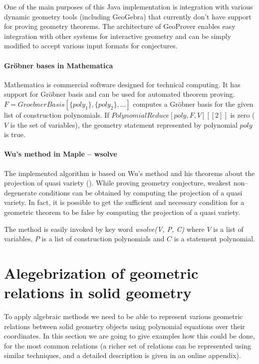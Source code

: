 \documentclass[final,1p,times,authoryear]{elsarticle}
\begin{document}
One of the main purposes of this Java implementation is integration
with various dynamic geometry tools (including GeoGebra) that
currently don't have support for proving geometry theorems. The
architecture of GeoProver enables easy integration with other systems
for interactive geometry and can be simply modified to accept various
input formats for conjectures.

\paragraph{Gr\"obner bases in Mathematica}

Mathematica is commercial software designed for technical
computing. It has support for Gr\"obner basis and can be used for
automated theorem proving. $F = GroebnerBasis[\{poly_1\}, \{poly_2\},
  \ldots]$ computes a Gr\"obner basis for the given list of
construction polynomials. If $PolynomialReduce[poly, F, V][[2]]$ is
zero ($V$ is the set of variables), the geometry statement represented
by polynomial $poly$ is true.

\paragraph{Wu's method in Maple -- wsolve}

The implemented algorithm is based on Wu's method and his theorems
about the projection of quasi variety (\cite{quasivarieties}). While
proving geometry conjecture, weakest non--degenerate conditions can be
obtained by computing the projection of a quasi variety. In fact, it
is possible to get the sufficient and necessary condition for a
geometric theorem to be false by computing the projection of a quasi
variety.

The method is easily invoked by key word \emph{wsolve(V, P, C)} where
$V$ is a list of variables, $P$ is a list of construction polynomials
and $C$ is a statement polynomial.

\section{Alegebrization of geometric relations in solid geometry}
\label{polynomials}
To apply algebraic methods we need to be able to represent various
geometric relations between solid geometry objects using polynomial
equations over their coordinates. In this section we are going to give
examples how this could be done, for the most common relations (a
richer set of relations can be represented using similar techniques,
and a detailed description is given in an online appendix). 
\end{document}
